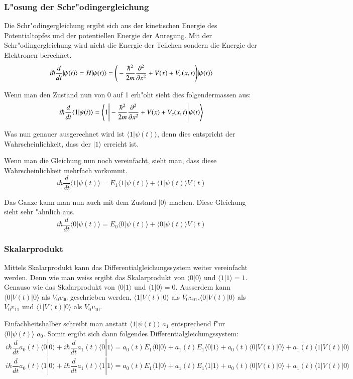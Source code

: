 \begin{refsection}
\subsubsection{L"osung der Schr"odingergleichung}
Die Schr"odingergleichung ergibt sich aus der kinetischen Energie des
Potentialtopfes und der potentiellen Energie der Anregung.
Mit der Schr"odingergleichung wird nicht die Energie der Teilchen
sondern die Energie der Elektronen berechnet.
\[
\ i\hbar\frac{d}{dt}|\psi(t)\rangle = H|\psi(t)\rangle = \Bigg{(}-\frac{\hbar^2}{2m} \frac{\partial^2}{\partial x^2}+V(x)+V_{e}(x,t)\Bigg{)}|\psi(t)\rangle
\]

Wenn man den Zustand nun von 0 auf 1 erh"oht sieht dies folgendermassen aus:
\[
\ i\hbar\frac{d}{dt}\langle1|\psi(t)\rangle = \Bigg{\langle}1\Bigg{|}-\frac{\hbar^2}{2m} \frac{\partial^2}{\partial x^2}+V(x)+V_{e}(x,t)\Bigg{|}\psi(t)\Bigg{\rangle}
\]

Was nun genauer ausgerechnet wird ist $\langle1|\psi(t)\rangle$, denn
dies entspricht der Wahrscheinlichkeit, dass der $|1\rangle$ erreicht ist.

Wenn man die Gleichung nun noch vereinfacht, sieht man, dass diese
Wahrscheinlichkeit mehrfach vorkommt.
\[
\ i\hbar\frac{d}{dt}\langle1|\psi(t)\rangle = E_{1}\langle1|\psi(t)\rangle+\langle1|\psi(t)\rangle V(t)
\]

Das Ganze kann man nun auch mit dem Zustand $|0\rangle$ machen. Diese
Gleichung sieht sehr "ahnlich aus.
\[
\ i\hbar\frac{d}{dt}\langle0|\psi(t)\rangle = E_{0}\langle0|\psi(t)\rangle+\langle0|\psi(t)\rangle V(t)
\]

\subsubsection{Skalarprodukt}

Mittels Skalarprodukt kann das Differentialgleichungssystem weiter
vereinfacht werden.
Denn wie man weiss ergibt das Skalarprodukt von $\langle0|0\rangle$
und $\langle1|1\rangle = 1$.
Genauso wie das Skalarprodukt von $\langle0|1\rangle$ und
$\langle1|0\rangle = 0$.
Ausserdem kann  $\langle0|V(t)|0\rangle$ als $V_{0}v_{00}$ geschrieben
werden, $\langle1|V(t)|0\rangle$ als $V_{0}v_{01}$,$\langle0|V(t)|0\rangle$
als $V_{0}v_{11}$ und $\langle1|V(t)|0\rangle$ als $V_{0}v_{10}$.

Einfachheitshalber schreibt man anstatt $\langle1|\psi(t)\rangle$ $a_1$
entsprechend f"ur $\langle0|\psi(t)\rangle$ $a_0$.
Somit ergibt sich dann folgendes Differentialgleichungssystem:
\[
\ i\hbar\frac{d}{dt}a_{0}(t)\langle0|0\rangle +i\hbar\frac{d}{dt}a_{1}(t)\langle0|1\rangle = a_{0}(t)E_{1}\langle0|0\rangle + a_{1}(t)E_{1}\langle0|1\rangle + a_{0}(t)\langle0|V(t)|0\rangle+ a_{1}(t)\langle1|V(t)|0\rangle
\]
\[
\ i\hbar\frac{d}{dt}a_{0}(t)\langle1|0\rangle +i\hbar\frac{d}{dt}a_{1}(t)\langle1|1\rangle = a_{0}(t)E_{1}\langle1|0\rangle + a_{1}(t)E_{1}\langle1|1\rangle + a_{0}(t)\langle0|V(t)|0\rangle+ a_{1}(t)\langle1|V(t)|0\rangle
\]


\end{refsection}

